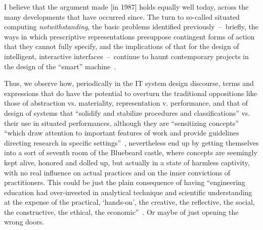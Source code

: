 \documentclass{article}
\let\origquotation\quotation
\let\endorigquotation\endquotation
\renewenvironment{quotation}{\vspace{-0.5\parskip}
  \origquotation
  \footnotesize
}{\endorigquotation}
\begin{document}
\begin{quotation}
I believe that the argument made [in 1987] holds equally well today, across the many developments that have occurred since. The turn to so-called situated computing \emph{notwithstanding}, the basic problems identified previously~--~briefly, the ways in which prescriptive representations presuppose contingent forms of action that they cannot fully specify, and the implications of that for the design of intelligent, interactive interfaces~--~continue to haunt contemporary projects in the design of the ``smart'' machine~\citep[p. 3, our emphasis ]{suchman_human-machine_2006}.
\end{quotation}

Thus, we observe how, periodically in the IT system design discourse, terms and expressions that do have the potential to overturn the traditional oppositions like those of abstraction vs. materiality, representation v. performance, and that of design of systems that ``solidify and stabilize procedures and classifications''\citep{orlikowski_duality_1992} vs. their use in situated performances, although they are ``sensitizing concepts'' ``which draw attention to important features of work and provide guidelines directing research in specific settings''~\citep{crabtree_wild_2001}, nevertheless end up by getting themselves into a sort of seventh room of the Bluebeard castle, where concepts are seemingly kept alive, honored and dolled up, but actually in a state of harmless captivity, with no real influence on actual practices and on the inner convictions of practitioners. This could be just the plain consequence of having ``engineering education had over-invested in analytical technique and scientific understanding at the expense of the practical, `hands-on', the creative, the reflective, the social, the constructive, the ethical, the economic''~\citep[p. 295]{bucciarelli_designing_2003}. Or maybe of just opening the wrong doors. 
\end{document}
